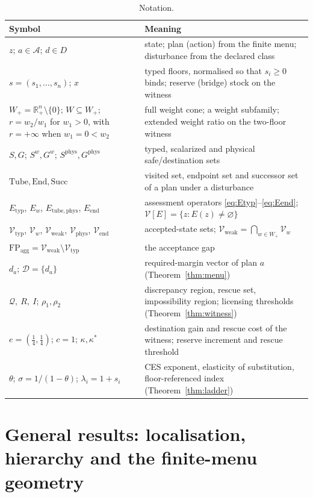 \documentclass[preprint,11pt,authoryear]{elsarticle}
\theoremstyle{definition}
\theoremstyle{remark}
\newcommand{\Etyp}{E_{\mathrm{typ}}}
\newcommand{\Eend}{E_{\mathrm{end}}}
\newcommand{\Ephys}{E_{\mathrm{tube,phys}}}
\newcommand{\Vtyp}{\mathcal{V}_{\mathrm{typ}}}
\newcommand{\Vweak}{\mathcal{V}_{\mathrm{weak}}}
\newcommand{\Vphys}{\mathcal{V}_{\mathrm{phys}}}
\newcommand{\Vend}{\mathcal{V}_{\mathrm{end}}}
\newcommand{\Wp}{W_+}
\newcommand{\FP}{\mathrm{FP}_{\mathrm{agg}}}
\newcommand{\Tube}{\mathrm{Tube}}
\newcommand{\Succ}{\mathrm{Succ}}
\newcommand{\End}{\mathrm{End}}
\newcommand{\Rp}{\mathbb{R}^n_+}
\newcommand{\Q}{\mathcal{Q}}
\begin{document}
\begin{table}[!htbp]
\centering\small
\caption{Notation.}
\label{tab:notation}
\begin{tabularx}{\textwidth}{@{}>{\raggedright\arraybackslash}p{}X@{}}
\toprule
Symbol & Meaning \\
\midrule
$z$; $a\in\mathcal A$; $d\in D$ & state; plan (action) from the finite menu; disturbance from the declared class \\
$s=(s_1,\dots,s_n)$; $x$ & typed floors, normalised so that $s_i\ge0$ binds; reserve (bridge) stock on the witness \\
$\Wp=\Rp\setminus\{0\}$; $W\subseteq\Wp$; $r=w_2/w_1$ for $w_1>0$, with $r=+\infty$ when $w_1=0<w_2$ & full weight cone; a weight subfamily; extended weight ratio on the two-floor witness \\
$S,G$; $S^w,G^w$; $S^{\mathrm{phys}},G^{\mathrm{phys}}$ & typed, scalarized and physical safe/destination sets \\
$\Tube,\End,\Succ$ & visited set, endpoint set and successor set of a plan under a disturbance \\
$\Etyp$, $E_w$, $\Ephys$, $\Eend$ & assessment operators \eqref{eq:Etyp}--\eqref{eq:Eend}; $\mathcal V[E]=\{z:E(z)\ne\varnothing\}$ \\
$\Vtyp$, $\mathcal V_w$, $\Vweak$, $\Vphys$, $\Vend$ & accepted-state sets; $\Vweak=\bigcap_{w\in\Wp}\mathcal V_w$ \\
$\FP=\Vweak\setminus\Vtyp$ & the acceptance gap \\
$d_a$; $\mathcal D=\{d_a\}$ & required-margin vector of plan $a$ (Theorem~\ref{thm:menu}) \\
$\Q,\ R,\ I$; $\rho_1,\rho_2$ & discrepancy region, rescue set, impossibility region; licensing thresholds (Theorem~\ref{thm:witness}) \\
$e=(\tfrac14,\tfrac14)$; $c=1$; $\kappa,\kappa^*$ & destination gain and rescue cost of the witness; reserve increment and rescue threshold \\
$\theta$; $\sigma=1/(1-\theta)$; $\lambda_i=1+s_i$ & CES exponent, elasticity of substitution, floor-referenced index (Theorem~\ref{thm:ladder}) \\
\bottomrule
\end{tabularx}
\end{table}

\section{General results: localisation, hierarchy and the finite-menu geometry}\label{sec:general}
\end{document}
